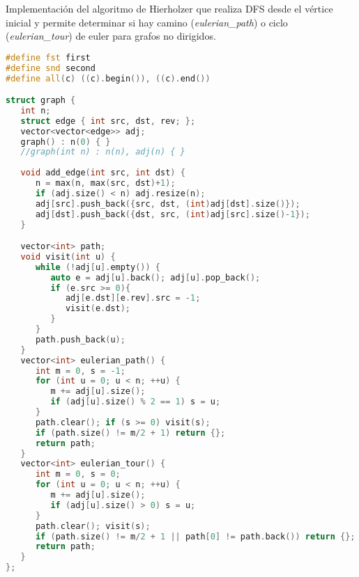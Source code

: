 Implementación del algoritmo de Hierholzer que realiza DFS desde el vértice inicial y permite determinar si hay camino (\emph{eulerian\_path}) o ciclo (\emph{eulerian\_tour}) de euler para grafos no dirigidos.

\begin{lstlisting}[language=C++]
#define fst first
#define snd second
#define all(c) ((c).begin()), ((c).end())

struct graph {
   int n;
   struct edge { int src, dst, rev; };
   vector<vector<edge>> adj;
   graph() : n(0) { }
   //graph(int n) : n(n), adj(n) { }
	
   void add_edge(int src, int dst) {
      n = max(n, max(src, dst)+1);
      if (adj.size() < n) adj.resize(n);
      adj[src].push_back({src, dst, (int)adj[dst].size()});
      adj[dst].push_back({dst, src, (int)adj[src].size()-1});
   }

   vector<int> path;
   void visit(int u) {
      while (!adj[u].empty()) {
         auto e = adj[u].back(); adj[u].pop_back();
         if (e.src >= 0){
            adj[e.dst][e.rev].src = -1;
            visit(e.dst);
         }
      }
      path.push_back(u);
   }
   vector<int> eulerian_path() {
      int m = 0, s = -1;
      for (int u = 0; u < n; ++u) {
         m += adj[u].size();
         if (adj[u].size() % 2 == 1) s = u;
      }
      path.clear(); if (s >= 0) visit(s);
      if (path.size() != m/2 + 1) return {};
      return path;
   }
   vector<int> eulerian_tour() {
      int m = 0, s = 0;
      for (int u = 0; u < n; ++u) {
         m += adj[u].size();
         if (adj[u].size() > 0) s = u;
      }
      path.clear(); visit(s);
      if (path.size() != m/2 + 1 || path[0] != path.back()) return {};
      return path;
   }
};
\end{lstlisting}

